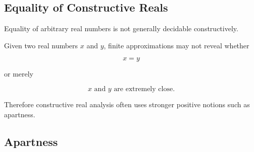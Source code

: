 
\subsection{Equality of Constructive Reals}
\label{subsec:constructive-real-equality}

Equality of arbitrary real numbers is not generally decidable
constructively.

Given two real numbers \(x\) and \(y\), finite approximations may not reveal
whether

\[
\boxed{
x=y
}
\]

or merely

\[
\boxed{
x
\text{ and }
y
\text{ are extremely close}.
}
\]

Therefore constructive real analysis often uses stronger positive notions
such as apartness.

\subsection{Apartness}
\label{subsec:apartness}


